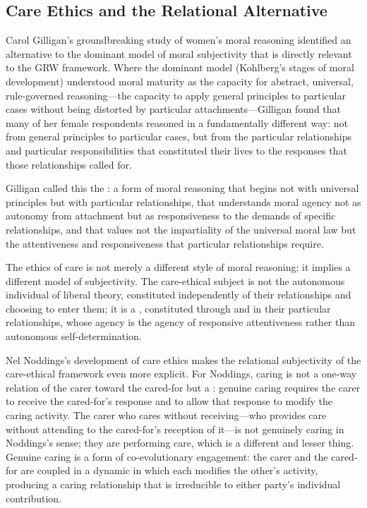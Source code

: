 \subsection{Care Ethics and the Relational Alternative}
\label{p15:subsec:care_ethics}

\noindent
Carol Gilligan's groundbreaking study of women's moral reasoning \parencite{gilligan1982} identified an alternative to the dominant model of moral subjectivity that is directly relevant to the GRW framework. Where the dominant model (Kohlberg's stages of moral development) understood moral maturity as the capacity for abstract, universal, rule-governed reasoning---the capacity to apply general principles to particular cases without being distorted by particular attachments---Gilligan found that many of her female respondents reasoned in a fundamentally different way: not from general principles to particular cases, but from the particular relationships and particular responsibilities that constituted their lives to the responses that those relationships called for.

Gilligan called this the : a form of moral reasoning that begins not with universal principles but with particular relationships, that understands moral agency not as autonomy from attachment but as responsiveness to the demands of specific relationships, and that values not the impartiality of the universal moral law but the attentiveness and responsiveness that particular relationships require.

The ethics of care is not merely a different style of moral reasoning; it implies a different model of subjectivity. The care-ethical subject is not the autonomous individual of liberal theory, constituted independently of their relationships and choosing to enter them; it is a , constituted through and in their particular relationships, whose agency is the agency of responsive attentiveness rather than autonomous self-determination.

Nel Noddings's development of care ethics \parencite{noddings1984} makes the relational subjectivity of the care-ethical framework even more explicit. For Noddings, caring is not a one-way relation of the carer toward the cared-for but a : genuine caring requires the carer to receive the cared-for's response and to allow that response to modify the caring activity. The carer who cares without receiving---who provides care without attending to the cared-for's reception of it---is not genuinely caring in Noddings's sense; they are performing care, which is a different and lesser thing. Genuine caring is a form of co-evolutionary engagement: the carer and the cared-for are coupled in a dynamic in which each modifies the other's activity, producing a caring relationship that is irreducible to either party's individual contribution.

